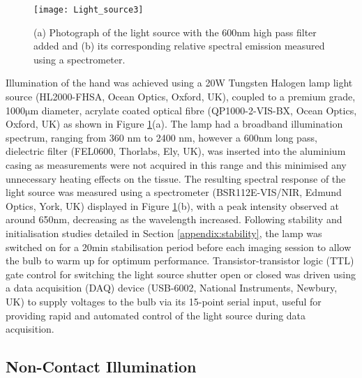 \documentclass[twoside]{bhamthesis}
\theoremstyle{definition}
\begin{document}
\begin{figure}[!ht]
\centering
  \texttt{[image: Light\_source3]}
\caption{(a) Photograph of the light source with the 600nm high pass filter added and (b) its corresponding relative spectral emission measured using a spectrometer.}
  \label{fig:Light_source3}
\end{figure}

Illumination of the hand was achieved using a 20W Tungsten Halogen lamp light source (HL2000-FHSA, Ocean Optics, Oxford, UK), coupled to a premium grade, 1000$\mathrm{\mu}$m diameter, acrylate coated optical fibre (QP1000-2-VIS-BX,  Ocean Optics, Oxford, UK) as shown in Figure \ref{fig:Light_source3}(a). The lamp had a broadband illumination spectrum, ranging from 360 nm to 2400 nm, however a 600nm long pass, dielectric filter (FEL0600, Thorlabs, Ely, UK), was inserted into the aluminium casing as measurements were not acquired in this range and this minimised any unnecessary heating effects on the tissue. The resulting spectral response of the light source was measured using a spectrometer (BSR112E-VIS/NIR, Edmund Optics, York, UK) displayed in Figure \ref{fig:Light_source3}(b), with a peak intensity observed at around 650nm, decreasing as the wavelength increased. Following stability and initialisation studies detailed in Section \ref{appendix:stability}, the lamp was switched on for a 20min stabilisation period before each imaging session to allow the bulb to warm up for optimum performance. Transistor-transistor logic (TTL) gate control for switching the light source shutter open or closed was driven using a data acquisition (DAQ) device (USB-6002, National Instruments, Newbury, UK) to supply voltages to the bulb via its 15-point serial input, useful for providing rapid and automated control of the light source during data acquisition.

\subsection{Non-Contact Illumination}
\end{document}
